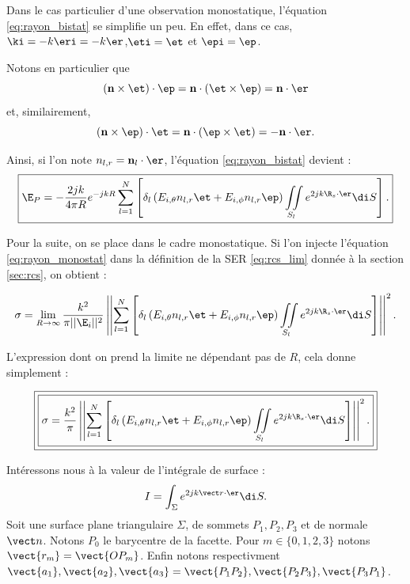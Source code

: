 Dans le cas particulier d'une observation monostatique, l'équation \eqref{eq:rayon_bistat} se simplifie un peu. En effet, dans ce cas, $\ki = -k\eri=-k\er$,$\eti = \et$ et $\epi = \ep$.

Notons en particulier que $$(\mathbf{n}\times\et)\cdot\ep = \mathbf n\cdot(\et\times\ep) = \mathbf n\cdot\er$$ et, similairement, $$(\mathbf{n}\times\ep)\cdot\et = \mathbf n \cdot(\ep\times\et) = -\mathbf n\cdot\er.$$

Ainsi, si l'on note $n_{l,r} = \mathbf n_l\cdot\er$, l'équation \eqref{eq:rayon_bistat} devient :
\begin{equation}
	\label{eq:rayon_monostat}
	\boxed{
	\E_P = - \frac{2jk}{4\pi R}e^{-jkR}\sum_{l=1}^N\left[\delta_l\left(E_{i,\theta}n_{l,r}\et+E_{i,\phi}n_{l,r}\ep\right)\iint\limits_{S_l}e^{2jk\R_s\cdot\er}\di S\right].
	}
\end{equation}

Pour la suite, on se place dans le cadre monostatique. Si l'on injecte l'équation \eqref{eq:rayon_monostat} dans la définition de la SER \eqref{eq:rcs_lim} donnée à la section \ref{sec:rcs}, on obtient :

\begin{equation}
	\sigma = \lim_{R\to\infty} \frac{k^2}{\pi||\E_i||^2} \left|\left|\sum_{l=1}^N\left[\delta_l\left(E_{i,\theta}n_{l,r}\et+E_{i,\phi}n_{l,r}\ep\right)\iint\limits_{S_l}e^{2jk\R_s\cdot\er}\di S\right]\right|\right|^2.
\end{equation}

L'expression dont on prend la limite ne dépendant pas de $R$, cela donne simplement :

\begin{equation}
	\label{eq:rcs}
	\boxed{\boxed{
	\sigma = \frac{k^2}{\pi} \left|\left|\sum\limits_{l=1}^N\left[\delta_l\left(E_{i,\theta}n_{l,r}\et+E_{i,\phi}n_{l,r}\ep\right)\iint\limits_{S_l}e^{2jk\R_s\cdot\er}\di S\right]\right|\right|^2.}}
\end{equation}

Intéressons nous à la valeur de l'intégrale de surface :
\begin{equation}
	\label{eq:integrale_osci}
	I = \int_\Sigma e^{2jk\vect r\cdot\er}\di S.
\end{equation}
Soit une surface plane triangulaire $\Sigma$, de sommets $P_1,P_2,P_3$ et de normale $\vect n$. Notons $P_0$ le barycentre de la facette. Pour $m\in\{0,1,2,3\}$ notons $\vect{r_m} = \vect{OP_m}$. Enfin notons respectivment $\vect{a_1},\vect{a_2},\vect{a_3} = \vect{P_1P_2},\vect{P_2P_3},\vect{P_3P_1}$.

